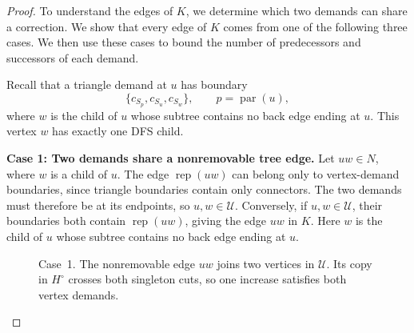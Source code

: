\documentclass[11pt]{amsart}
\newcommand{\rep}[1]{\operatorname{rep}(#1)}
\newcommand{\1}{\mathbbm{1}}
\begin{document}
\begin{proof}
To understand the edges of $K$, we determine which two
demands can share a correction. We show that every edge
of $K$ comes from one of the following three cases.
We then use these cases to bound the number of predecessors
and successors of each demand.

Recall that a triangle demand at $u$ has boundary
\[
 \{c_{S_p},c_{S_u},c_{S_w}\},
 \qquad p=\operatorname{par}(u),
\]
where $w$ is the child of $u$ whose subtree contains no
back edge ending at $u$. This vertex $w$ has exactly
one DFS child.

\smallskip\noindent
\textbf{Case 1: Two demands share a nonremovable tree edge.}
Let $uw\in N$, where $w$ is a child of $u$.
The edge $\rep{uw}$ can belong only to vertex-demand
boundaries, since triangle boundaries contain only connectors.
The two demands must therefore be at its endpoints,
so $u,w\in\mathcal U$.
Conversely, if $u,w\in\mathcal U$, their boundaries both
contain $\rep{uw}$, giving the edge $uw$ in $K$.
Here $w$ is the child of $u$ whose subtree contains no
back edge ending at $u$.

\begin{figure}[H]
\centering
{}
\caption{Case~1. The nonremovable edge $uw$ joins two vertices in
$\mathcal U$. Its copy in $H^\circ$ crosses both singleton cuts,
so one increase satisfies both vertex demands.}
\label{fig:quartic-case-one}
\end{figure}


\end{proof}
\end{document}
